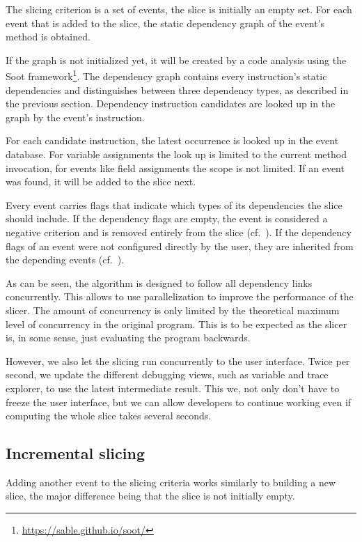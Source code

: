 ﻿\documentclass[
      english,
			conference,
      ]{IEEEtran}
\begin{document}
The slicing criterion is a set of events, the slice is initially an empty set.
For each event that is added to the slice, the static dependency graph of the event's method is obtained.

If the graph is not initialized yet, it will be created by a code analysis using the Soot framework\footnote{\url{https://sable.github.io/soot/}}.
The dependency graph contains every instruction's static dependencies and distinguishes between three dependency types, as described in the previous section.
Dependency instruction candidates are looked up in the graph by the event's instruction.

For each candidate instruction, the latest occurrence is looked up in the event database.
For variable assignments the look up is limited to the current method invocation, for events like field assignments the scope is not limited.
If an event was found, it will be added to the slice next.

Every event carries flags that indicate which types of its dependencies the slice should include.
If the dependency flags are empty, the event is considered a negative criterion and is removed entirely from the slice (cf.~).
If the dependency flags of an event were not configured directly by the user, they are inherited from the depending events (cf.~).

As can be seen, the algorithm is designed to follow all dependency links concurrently.
This allows to use parallelization to improve the performance of the slicer.
The amount of concurrency is only limited by the theoretical maximum level of concurrency in the original program.
This is to be expected as the slicer is, in some sense, just evaluating the program backwards.

However, we also let the slicing run concurrently to the user interface.
Twice per second, we update the different debugging views, such as variable and trace explorer, to use the latest intermediate result.
This we, not only don't have to freeze the user interface, but we can allow developers to continue working even if computing the whole slice takes several seconds.

\subsection{Incremental slicing}

Adding another event to the slicing criteria works similarly to building a new slice, the major difference being that the slice is not initially empty.
\end{document}
